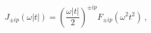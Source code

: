 \begin{equation*}
J_{\pm ip}(\omega |t|)=\left( \frac{\omega |t|}{2}\right) ^{\pm ip}F_{\pm
ip}\left( \omega ^{2}t^{2}\right) \ ,
\end{equation*}

